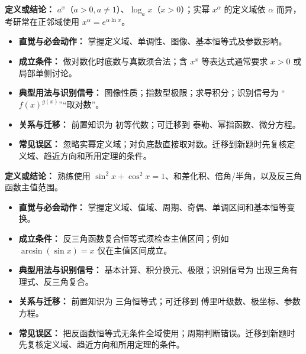 \begin{knowledgeBox}
\textbf{定义或结论：} $a^x$（$a>0,a\ne1$）、$\log_a x$（$x>0$）；实幂 $x^\alpha$ 的定义域依 $\alpha$ 而异，考研常在正邻域使用 $x^\alpha=e^{\alpha\ln x}$。

\begin{itemize}
  \item \textbf{直觉与必会动作：} 掌握定义域、单调性、图像、基本恒等式及参数影响。
  \item \textbf{成立条件：} 做对数化时底数与真数须合法；含 $x^x$ 等表达式通常要求 $x>0$ 或局部单侧讨论。
  \item \textbf{典型用法与识别信号：} 图像性质；指数型极限；求导积分；识别信号为 “$f(x)^{g(x)}$”“取对数”。
  \item \textbf{关系与迁移：} 前置知识为 初等代数；可迁移到 泰勒、幂指函数、微分方程。
  \item \textbf{常见误区：} 忽略实幂定义域；对负底数直接取对数。迁移到新题时先复核定义域、趋近方向和所用定理的条件。
\end{itemize}
\end{knowledgeBox}

\begin{knowledgeBox}
\textbf{定义或结论：} 熟练使用 $\sin^2x+\cos^2x=1$、和差化积、倍角/半角，以及反三角函数主值范围。

\begin{itemize}
  \item \textbf{直觉与必会动作：} 掌握定义域、值域、周期、奇偶、单调区间和基本恒等变换。
  \item \textbf{成立条件：} 反三角函数复合恒等式须检查主值区间；例如 $\arcsin(\sin x)=x$ 仅在主值区间成立。
  \item \textbf{典型用法与识别信号：} 基本计算、积分换元、极限；识别信号为 出现三角有理式、反三角复合。
  \item \textbf{关系与迁移：} 前置知识为 三角恒等式；可迁移到 傅里叶级数、极坐标、参数方程。
  \item \textbf{常见误区：} 把反函数恒等式无条件全域使用；周期判断错误。迁移到新题时先复核定义域、趋近方向和所用定理的条件。
\end{itemize}
\end{knowledgeBox}

